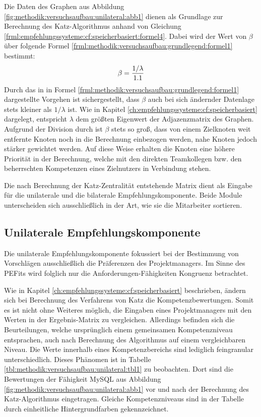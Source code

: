 Die Daten des Graphen aus Abbildung \ref{fig:methodik:versuchsaufbau:unilateral:abb1} dienen als Grundlage zur Berechnung des Katz-Algorithmus anhand von Gleichung \ref{frml:empfehlungssysteme:cf:speicherbasiert:formel4}. Dabei wird der Wert von $\beta$ über folgende Formel \ref{frml:methodik:versuchsaufbau:grundlegend:formel1} bestimmt: 
\begin{equation}
	\beta = \frac{1/\lambda}{1.1}
	\label{frml:methodik:versuchsaufbau:grundlegend:formel1}
\end{equation}
Durch das in in Formel \ref{frml:methodik:versuchsaufbau:grundlegend:formel1} dargestellte Vorgehen ist sichergestellt, dass $\beta$ auch bei sich ändernder Datenlage stets kleiner als $1/\lambda$ ist. Wie in Kapitel \ref{ch:empfehlungssysteme:cf:speicherbasiert} dargelegt, entspricht $\lambda$ dem größten Eigenwert der Adjazenzmatrix des Graphen. Aufgrund der Division durch \nenner ist $\beta$ stets so groß, dass von einem Zielknoten weit entfernte Knoten noch in die Berechnung einbezogen werden, nahe Knoten jedoch stärker gewichtet werden. Auf diese Weise erhalten die Knoten eine höhere Priorität in der Berechnung, welche mit den direkten Teamkollegen bzw. den beherrschten Kompetenzen eines Zielnutzers in Verbindung stehen.

Die nach Berechnung der Katz-Zentralität entstehende Matrix dient als Eingabe für die unilaterale und die bilaterale Empfehlungskomponente. Beide Module unterscheiden sich ausschließlich in der Art, wie sie die Mitarbeiter sortieren.

\subsection{Unilaterale Empfehlungskomponente}
\label{ch:methodik:versuchsaufbau:unilateral}
Die unilaterale Empfehlungskomponente fokussiert bei der Bestimmung von Vorschlägen ausschließlich die Präferenzen des Projektmanagers. Im Sinne des \acp{PEFit} wird folglich nur die Anforderungen-Fähigkeiten Kongruenz betrachtet.

Wie in Kapitel \ref{ch:empfehlungssysteme:cf:speicherbasiert} beschrieben, ändern sich bei Berechnung des Verfahrens von Katz die Kompetenzbewertungen. Somit es ist nicht ohne Weiteres möglich, die Eingaben eines Projektmanagers mit den Werten in der Ergebnis-Matrix zu vergleichen. Allerdings befinden sich die Beurteilungen, welche ursprünglich einem gemeinsamen Kompetenzniveau entsprachen, auch nach Berechnung des Algorithmus auf einem vergleichbaren Niveau. Die Werte innerhalb eines Kompetenzbereichs sind lediglich feingranular unterschiedlich. Dieses Phänomen ist in Tabelle \ref{tbl:methodik:versuchsaufbau:unilateral:tbl1} zu beobachten. Dort sind die Bewertungen der Fähigkeit MySQL aus Abbildung \ref{fig:methodik:versuchsaufbau:unilateral:abb1} vor und nach der Berechnung des Katz-Algorithmus eingetragen. Gleiche Kompetenzniveaus sind in der Tabelle durch einheitliche Hintergrundfarben gekennzeichnet.

